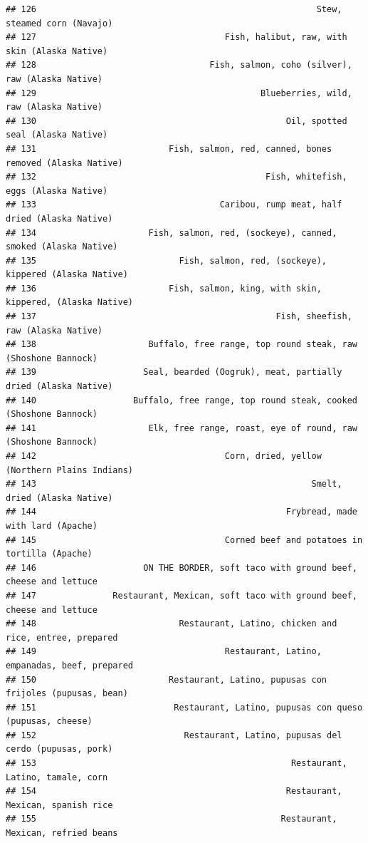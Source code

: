 \documentclass[
]{article}
\begin{document}
\begin{verbatim}
## 126                                                       Stew, steamed corn (Navajo)
## 127                                     Fish, halibut, raw, with skin (Alaska Native)
## 128                                  Fish, salmon, coho (silver), raw (Alaska Native)
## 129                                            Blueberries, wild, raw (Alaska Native)
## 130                                                 Oil, spotted seal (Alaska Native)
## 131                          Fish, salmon, red, canned, bones removed (Alaska Native)
## 132                                             Fish, whitefish, eggs (Alaska Native)
## 133                                    Caribou, rump meat, half dried (Alaska Native)
## 134                      Fish, salmon, red, (sockeye), canned, smoked (Alaska Native)
## 135                            Fish, salmon, red, (sockeye), kippered (Alaska Native)
## 136                          Fish, salmon, king, with skin, kippered, (Alaska Native)
## 137                                               Fish, sheefish, raw (Alaska Native)
## 138                      Buffalo, free range, top round steak, raw (Shoshone Bannock)
## 139                     Seal, bearded (Oogruk), meat, partially dried (Alaska Native)
## 140                   Buffalo, free range, top round steak, cooked (Shoshone Bannock)
## 141                      Elk, free range, roast, eye of round, raw (Shoshone Bannock)
## 142                                     Corn, dried, yellow (Northern Plains Indians)
## 143                                                      Smelt, dried (Alaska Native)
## 144                                                 Frybread, made with lard (Apache)
## 145                                     Corned beef and potatoes in tortilla (Apache)
## 146                     ON THE BORDER, soft taco with ground beef, cheese and lettuce
## 147               Restaurant, Mexican, soft taco with ground beef, cheese and lettuce
## 148                            Restaurant, Latino, chicken and rice, entree, prepared
## 149                                     Restaurant, Latino, empanadas, beef, prepared
## 150                          Restaurant, Latino, pupusas con frijoles (pupusas, bean)
## 151                           Restaurant, Latino, pupusas con queso (pupusas, cheese)
## 152                             Restaurant, Latino, pupusas del cerdo (pupusas, pork)
## 153                                                  Restaurant, Latino, tamale, corn
## 154                                                 Restaurant, Mexican, spanish rice
## 155                                                Restaurant, Mexican, refried beans

\end{verbatim}
\end{document}
